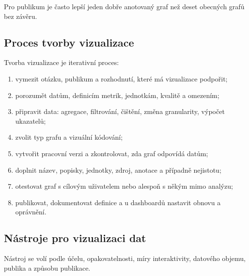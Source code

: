 Pro publikum je často lepší jeden dobře anotovaný graf než deset obecných grafů bez závěru.

\subsection{Proces tvorby vizualizace}
Tvorba vizualizace je iterativní proces:
\begin{enumerate}
  \item vymezit otázku, publikum a rozhodnutí, které má vizualizace podpořit;
  \item porozumět datům, definicím metrik, jednotkám, kvalitě a omezením;
  \item připravit data: agregace, filtrování, čištění, změna granularity, výpočet ukazatelů;
  \item zvolit typ grafu a vizuální kódování;
  \item vytvořit pracovní verzi a zkontrolovat, zda graf odpovídá datům;
  \item doplnit název, popisky, jednotky, zdroj, anotace a případně nejistotu;
  \item otestovat graf s cílovým uživatelem nebo alespoň s někým mimo analýzu;
  \item publikovat, dokumentovat definice a u dashboardů nastavit obnovu a oprávnění.
\end{enumerate}

\subsection{Nástroje pro vizualizaci dat}
Nástroj se volí podle účelu, opakovatelnosti, míry interaktivity, datového objemu, publika a způsobu
publikace.

